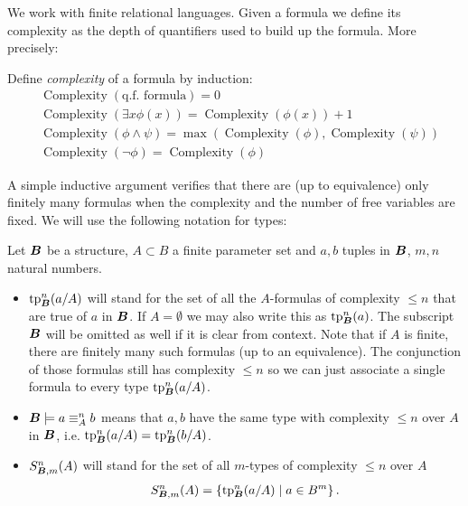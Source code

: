 \documentclass{amsart}
\DeclareMathOperator{\B}{\boldface B}
\DeclareMathOperator{\cx}{Complexity}
\newcommand{\curly}[1]{\left\{#1\right\}}
\begin{document}
We work with finite relational languages.
Given a formula we define its complexity as the depth of quantifiers used to build up the formula. More precisely:
\begin{Definition}
Define \emph{complexity} of a formula by induction:
\begin{align*}
	&\cx(\text{q.f. formula}) = 0 \\
	&\cx(\exists x \phi(x)) = \cx(\phi(x)) + 1 \\
	&\cx(\phi \wedge \psi) = \max(\cx(\phi), \cx(\psi)) \\
	&\cx(\neg \phi) = \cx(\phi)
\end{align*}
\end{Definition}
A simple inductive argument verifies that there are (up to equivalence) only finitely many formulas when the complexity and the number of free variables are fixed.
We will use the following notation for types:
\begin{Definition} Let $\B$ be a structure, $A \subset B$ a finite parameter set and $a,b$ tuples in $\B$, $m, n$ natural numbers.
  \begin{itemize}
  \item $\tp^n_{\B}(a/A)$ will stand for the set of all the $A$-formulas of complexity $\leq n$ that are true of $a$ in $\B$.
    If $A = \emptyset$ we may also write this as $\tp^n_{\B}(a)$.
    The subscript $\B$ will be omitted as well if it is clear from context.
    Note that if $A$ is finite, there are finitely many such formulas (up to an equivalence).
    The conjunction of those formulas still has complexity $\leq n$ so we can just associate a single formula to every type $\tp^n_{\B}(a/A)$.
  \item $\B \models a \equiv^n_A b$ means that $a,b$ have the same type with complexity $\leq n$ over $A$ in $\B$, i.e. $\tp^n_{\B}(a/A) = \tp^n_{\B}(b/A)$.
  \item $S^n_{\B, m}(A)$ will stand for the set of all $m$-types of complexity $\leq n$ over $A$
    \begin{align*}
      S^n_{\B, m}(A) = \curly{\tp^n_{\B}(a/A) \mid a \in B^m}.
    \end{align*}
  \end{itemize}
\end{Definition}
\end{document}

